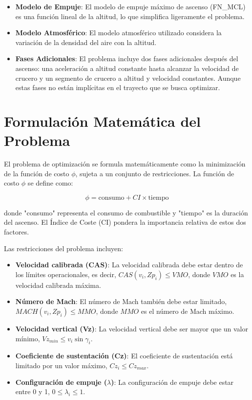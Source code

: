 \documentclass[fleqn]{article}
\begin{document}
\begin{itemize}
    \item \textbf{Modelo de Empuje}: El modelo de empuje máximo de ascenso (FN\_MCL) es una función lineal de la altitud, lo que simplifica ligeramente el problema.

    \item \textbf{Modelo Atmosférico}: El modelo atmosférico utilizado considera la variación de la densidad del aire con la altitud.

    \item \textbf{Fases Adicionales}: El problema incluye dos fases adicionales después del ascenso: una aceleración a altitud constante hasta alcanzar la velocidad de crucero y un segmento de crucero a altitud y velocidad constantes. Aunque estas fases no están implícitas en el trayecto que se busca optimizar.
\end{itemize}

\section{Formulación Matemática del Problema}

El problema de optimización se formula matemáticamente como la minimización de la función de costo $\phi$, sujeta a un conjunto de restricciones.  La función de costo $\phi$ se define como:

\begin{equation}
\phi = \text{consumo} + CI \times \text{tiempo}
\end{equation}

donde "consumo" representa el consumo de combustible y "tiempo" es la duración del ascenso. El Índice de Coste (CI) pondera la importancia relativa de estos dos factores.

Las restricciones del problema incluyen:

\begin{itemize}
    \item \textbf{Velocidad calibrada (CAS)}: La velocidad calibrada debe estar dentro de los límites operacionales, es decir, $CAS(v_i, Zp_i) \leq VMO$, donde $VMO$ es la velocidad calibrada máxima.
    \item \textbf{Número de Mach}: El número de Mach también debe estar limitado, $MACH(v_i, Zp_i) \leq MMO$, donde $MMO$ es el número de Mach máximo.
    \item \textbf{Velocidad vertical (Vz)}: La velocidad vertical debe ser mayor que un valor mínimo, $Vz_{min} \leq v_i \sin \gamma_i$.
    \item \textbf{Coeficiente de sustentación (Cz)}: El coeficiente de sustentación está limitado por un valor máximo, $Cz_i \leq Cz_{max}$.
    \item \textbf{Configuración de empuje ($\lambda$)}: La configuración de empuje debe estar entre 0 y 1, $0 \leq \lambda_i \leq 1$.
\end{itemize}
\end{document}
